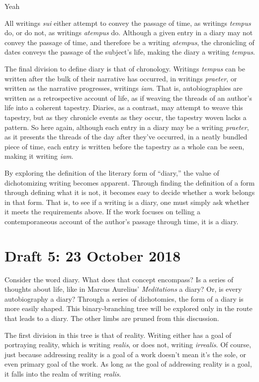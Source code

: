 Yeah \documentclass[12pt]{article}[titlepage]
\newcommand{\say}[1]{``#1''}
\newcommand{\1}{\={a}}
\newcommand{\2}{\={e}}
\newcommand{\3}{\={\i}}
\newcommand{\4}{\=o}
\newcommand{\5}{\=u}
\newcommand{\6}{\={A}}
\renewcommand{\,}{\textsuperscript{,}}
\begin{document}
All writings \textit{sui} either attempt to convey the passage of time, as writings \textit{tempus} do, or do not, as writings \textit{atempus} do.
Although a given entry in a diary may not convey the passage of time, and therefore be a writing \textit{atempus}, the chronicling of dates conveys the passage of the subject's life, making the diary a writing \textit{tempus}.

The final division to define diary is that of chronology.
Writings \textit{tempus} can be written after the bulk of their narrative has occurred, in writings \textit{praeter}, or written as the narrative progresses, writings \textit{iam}.
That is, autobiographies are written as a retrospective account of life, as if weaving the threads of an  author's life into a coherent tapestry.
Diaries, as a contrast, may attempt to weave this tapestry, but as they chronicle events as they occur, the tapestry woven lacks a pattern.
So here again, although each entry in a diary may be a writing \textit{praeter}, as it presents the threads of the day after they've occurred, in a neatly bundled piece of time, each entry is written before the tapestry as a whole can be seen, making it writing \textit{iam}.

By exploring the definition of the literary form of \say{diary,} the value of dichotomizing writing becomes apparent.
Through finding the definition of a form through defining what it is not, it becomes easy to decide whether a work belongs in that form.
That is, to see if a writing is a diary, one must simply ask whether it meets the requirements above.
If the work focuses on telling a contemporaneous account of the author's passage through time, it is a diary.
 
\section{Draft 5: 23 October 2018}
Consider the word diary.
What does that concept encompass?
Is a series of thoughts about life, like in Marcus Aurelius' \textit{Meditations} a diary?
Or, is every autobiography a diary?
Through a series of dichotomies, the form of a diary is more easily shaped. 
This binary-branching tree will be explored only in the route that leads to a diary.
The other limbs are pruned from this discussion.

The first division in this tree is that of reality.
Writing either has a goal of portraying reality, which is writing \textit{realis}, or does not, writing \textit{irrealis}.
Of course, just because addressing reality is a goal of a work doesn't mean it's the sole, or even primary goal of the work.
As long as the goal of addressing reality is a goal, it falls into the realm of writing \textit{realis}.
\end{document}
